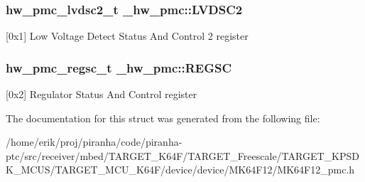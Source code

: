\subsubsection[{\texorpdfstring{L\+V\+D\+S\+C2}{LVDSC2}}]{ {\bf hw\+\_\+pmc\+\_\+lvdsc2\+\_\+t} \+\_\+hw\+\_\+pmc\+::\+L\+V\+D\+S\+C2}\hypertarget{struct__hw__pmc_ab25fb2b4183838773bb50a16865d541f}{}\label{struct__hw__pmc_ab25fb2b4183838773bb50a16865d541f}
\mbox{[}0x1\mbox{]} Low Voltage Detect Status And Control 2 register 
\subsubsection[{\texorpdfstring{R\+E\+G\+SC}{REGSC}}]{ {\bf hw\+\_\+pmc\+\_\+regsc\+\_\+t} \+\_\+hw\+\_\+pmc\+::\+R\+E\+G\+SC}\hypertarget{struct__hw__pmc_afb85d4ea5f03175a7189de426614b16c}{}\label{struct__hw__pmc_afb85d4ea5f03175a7189de426614b16c}
\mbox{[}0x2\mbox{]} Regulator Status And Control register 

The documentation for this struct was generated from the following file\+:\begin{DoxyCompactItemize}
\item 
/home/erik/proj/piranha/code/piranha-\/ptc/src/receiver/mbed/\+T\+A\+R\+G\+E\+T\+\_\+\+K64\+F/\+T\+A\+R\+G\+E\+T\+\_\+\+Freescale/\+T\+A\+R\+G\+E\+T\+\_\+\+K\+P\+S\+D\+K\+\_\+\+M\+C\+U\+S/\+T\+A\+R\+G\+E\+T\+\_\+\+M\+C\+U\+\_\+\+K64\+F/device/device/\+M\+K64\+F12/M\+K64\+F12\+\_\+pmc.\+h\end{DoxyCompactItemize}
